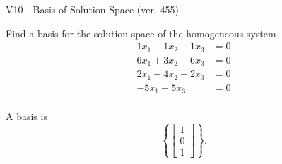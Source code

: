 \begin{exercise}
  \begin{exerciseTitle}V10 - Basis of Solution Space (ver. 455)\end{exerciseTitle}
  \begin{exerciseStatement}
    Find a basis for the solution space of the homogeneous system 
\begin{align*}
 1 x_ 1 -1 x_ 2 -1 x_ 3 &= 0  \\ 
  6 x_ 1 + 3 x_ 2 -6 x_ 3 &= 0  \\ 
  2 x_ 1 -4 x_ 2 -2 x_ 3 &= 0  \\ 
  -5 x_ 1 + 5 x_ 3 &= 0  \\ 
 \end{align*}


 
  \end{exerciseStatement}

  \begin{exerciseAnswer}
   A basis is   
\[\left\{\left[\begin{array}{c}
1 \\
0 \\
1
\end{array}\right]\right\}.\]

  


  \end{exerciseAnswer}
\end{exercise}
